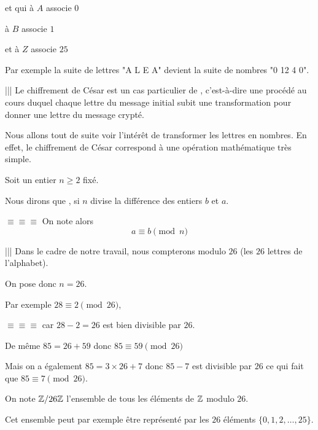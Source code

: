 et qui à $A$ associe $0$

à $B$ associe $1$

et à $Z$ associe $25$

\change

Par exemple la suite de lettres  
"A L E A" 
devient la suite de nombres 
"0 12 4 0".

\change
 
||| Le chiffrement de César est un cas particulier de , 
c'est-à-dire une procédé au cours duquel cha\-que lettre du message initial subit une transformation pour donner une lettre du message crypté.

\change

Nous allons tout de suite voir l'intérêt de transformer les lettres en nombres. 
En effet, le chiffrement de César correspond à une opération mathématique très simple.

\diapo

Soit un entier $n \ge 2$ fixé.

Nous dirons que ,
si $n$ divise la différence des entiers $b$ et $a$.

\change

$\equiv \equiv \equiv$ On note alors 
$$a \equiv b \pmod n$$ 


\change

|||  Dans le cadre de notre travail, nous compterons modulo $26$ (les $26$ lettres de l'alphabet).

On pose donc $n=26$. 

Par exemple $28 \equiv  2 \pmod {26}$,

\change

$\equiv \equiv \equiv$ car $28-2=26$ est bien divisible par $26$. 

\change

De même $85 = 26+ 59$ donc $85 \equiv  59 \pmod {26}$

\change
Mais on a également $85 = 3 \times 26+ 7$ donc $85-7$ est divisible par $26$ ce qui fait que 
$85 \equiv  7 \pmod {26}$. 

\change

On note $\mathbb{Z}/26 \mathbb{Z}$ l'ensemble de tous les éléments de $\mathbb{Z}$ modulo $26$. 

\change

Cet ensemble peut par exemple être représenté par les $26$ éléments $\{0,1,2,\ldots, 25\}$. 

\change

